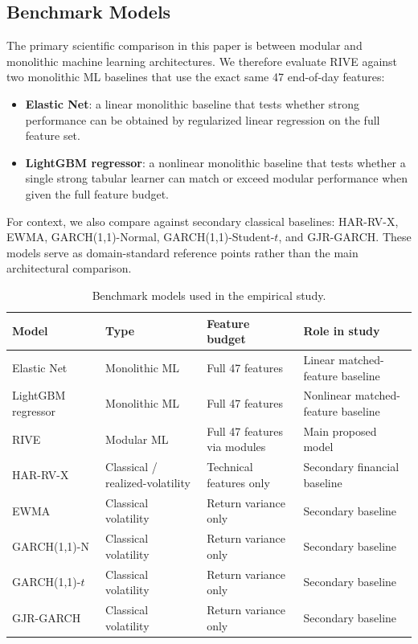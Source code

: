 \documentclass[review]{elsarticle}
\begin{document}
\subsection{Benchmark Models}\label{benchmark-models-setup}

The primary scientific comparison in this paper is between modular and monolithic machine learning architectures. We therefore evaluate RIVE against two monolithic ML baselines that use the exact same 47 end-of-day features:
\begin{itemize}
    \item \textbf{Elastic Net}: a linear monolithic baseline that tests whether strong performance can be obtained by regularized linear regression on the full feature set.
    \item \textbf{LightGBM regressor}: a nonlinear monolithic baseline that tests whether a single strong tabular learner can match or exceed modular performance when given the full feature budget.
\end{itemize}

For context, we also compare against secondary classical baselines: HAR-RV-X, EWMA, GARCH(1,1)-Normal, GARCH(1,1)-Student-$t$, and GJR-GARCH. These models serve as domain-standard reference points rather than the main architectural comparison.

\begin{table}[t]
\centering
\caption{Benchmark models used in the empirical study.}
\label{tab:benchmark-specs}
\begin{tabular}{llll}
\hline
Model & Type & Feature budget & Role in study \\\hline
Elastic Net & Monolithic ML & Full 47 features & Linear matched-feature baseline \\
LightGBM regressor & Monolithic ML & Full 47 features & Nonlinear matched-feature baseline \\
RIVE & Modular ML & Full 47 features via modules & Main proposed model \\
HAR-RV-X & Classical / realized-volatility & Technical features only & Secondary financial baseline \\
EWMA & Classical volatility & Return variance only & Secondary baseline \\
GARCH(1,1)-N & Classical volatility & Return variance only & Secondary baseline \\
GARCH(1,1)-$t$ & Classical volatility & Return variance only & Secondary baseline \\
GJR-GARCH & Classical volatility & Return variance only & Secondary baseline \\\hline
\end{tabular}
\end{table}
\end{document}
